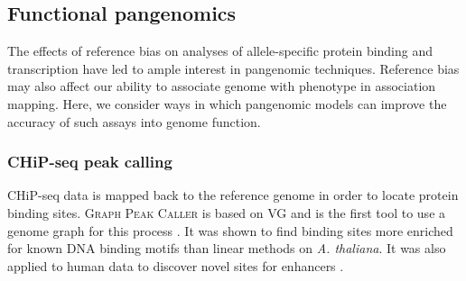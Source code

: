 %

\subsection{Functional pangenomics}
\label{sec:functionalgenomics}

The effects of reference bias on analyses of allele-specific protein binding and transcription have led to ample interest in pangenomic techniques.
Reference bias may also affect our ability to associate genome with phenotype in association mapping.
Here, we consider ways in which pangenomic models can improve the accuracy of such assays into genome function.

\subsubsection{CHiP-seq peak calling}

CHiP-seq data is mapped back to the reference genome in order to locate protein binding sites.
\textsc{Graph Peak Caller} is based on \textsc{VG} and is the first tool to use a genome graph for this process \cite{Grytten_2019}.
It was shown to find binding sites more enriched for known DNA binding motifs than linear methods on \emph{A. thaliana}.
It was also applied to human data to discover novel sites for enhancers \cite{groza2019personalized}.

